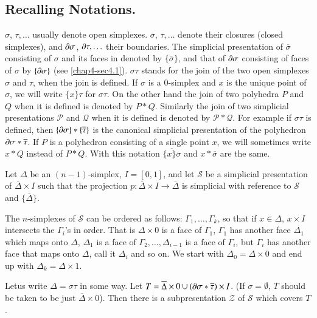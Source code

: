 \subsection{Recalling Notations.}\label{chap7-sec7.1.1}\pageoriginale
$\sigma$, $\tau,\ldots$ usually denote open
simplexes. $\overline{\sigma}$, $\overline{\tau},\ldots$ denote their
closures {\small (closed simplexes)}, and $\partial \sigma$, $\partial \tau,\ldots$ their boundaries. The simplicial presentation of $\overline{\sigma}$ consisting of $\sigma$ and its faces in denoted by $\{\overline{\sigma}\}$, and that of $\partial \sigma$ consisting of faces of $\sigma$ by $\{\partial \sigma\}$ (see \ref{chap4-sec4.1}). $\sigma\tau$ stands for the join of the two open simplexes $\sigma$ and $\tau$, when the join is defined. If $\sigma$ is a $0$-simplex and $x$ is the unique point of $\sigma$, we will write $\{x\}\tau$ for $\sigma\tau$. On the other hand the join of two polyhedra $P$ and $Q$ when it is defined is denoted by $P\ast Q$. Similarly the join of two simplicial presentations $\mathscr{P}$ and $\mathcal{Q}$ when it is defined is denoted by $\mathscr{P}\ast \mathcal{Q}$. For example if $\sigma\tau$ is defined, then $\{\partial \sigma\}\ast\{\overline{\tau}\}$ is the canonical simplicial presentation of the polyhedron $\partial \sigma\ast\overline{\tau}$. If $P$ is a polyhedron consisting of a single 
point $x$, we will sometimes write $x\ast Q$ instead of $P\ast Q$. With this notation $\overline{\{x\}\sigma}$ and $x\ast \overline{\sigma}$ are the same.

Let $\Delta$ be an $(n-1)$-simplex, $I=[0,1]$, and let $\mathscr{S}$ be a simplicial presentation of $\overline{\Delta}\times I$ such that the projection $p:\overline{\Delta}\times I\to \overline{\Delta}$ is simplicial with reference to $\mathscr{S}$ and $\{\overline{\Delta}\}$.

The $n$-simplexes of $\mathscr{S}$ can be ordered as follows: $\Gamma_{1},\ldots,\Gamma_{k}$, so that if $x\in\Delta$, $x\times I$ intersects the $\Gamma_{i}$'s in order. That is $\Delta \times 0$ is a face of $\Gamma_{1}$, $\Gamma_{1}$ has another face $\Delta_{1}$ which maps onto $\Delta$, $\Delta_{1}$ is a face of $\Gamma_{2},\ldots,\Delta_{i-1}$ is a face of $\Gamma_{i}$, but $\Gamma_{i}$ has another face that maps onto $\Delta$, call it $\Delta_{i}$ and so on. We start with $\Delta_{0}=\Delta\times 0$ and end up with $\Delta_{k}=\Delta\times 1$.

Let\pageoriginale us write $\Delta=\sigma\tau$ in some way. Let $T=\overline{\Delta}\times 0\cup (\partial \sigma\ast\overline{\tau})\times I$. (If $\sigma=\emptyset$, $T$ should be taken to be just $\overline{\Delta}\times 0$). Then there is a subpresentation $\mathscr{Z}$ of $\mathscr{S}$ which covers $T$.

